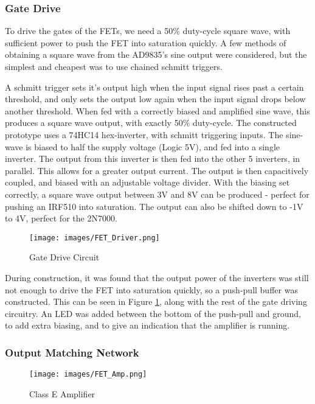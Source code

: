 \documentclass[a4paper,12pt]{article}
\begin{document}
\subsubsection{Gate Drive}
To drive the gates of the FETs, we need a 50\% duty-cycle square wave, with sufficient power to push the FET into saturation quickly. A few methods of obtaining a square wave from the AD9835's sine output were considered, but the simplest and cheapest was to use chained schmitt triggers.

A schmitt trigger sets it's output high when the input signal rises past a certain threshold, and only sets the output low again when the input signal drops below another threshold. When fed with a correctly biased and amplified sine wave, this produces a square wave output, with exactly 50\% duty-cycle. The constructed prototype uses a 74HC14 hex-inverter, with schmitt triggering inputs. The sine-wave is biased to half the supply voltage (Logic 5V), and fed into a single inverter. The output from this inverter is then fed into the other 5 inverters, in parallel. This allows for a greater output current. The output is then capacitively coupled, and biased with an adjustable voltage divider. With the biasing set correctly, a square wave output between 3V and 8V can be produced - perfect for pushing an IRF510 into saturation. The output can also be shifted down to -1V to 4V, perfect for the 2N7000.

\begin{figure}[h]
  \begin{center}
    \texttt{[image: images/FET\_Driver.png]}
  \end{center}
  \caption{Gate Drive Circuit}
  \label{fig:fet_drive}
\end{figure}

During construction, it was found that the output power of the inverters was still not enough to drive the FET into saturation quickly, so a push-pull buffer was constructed. This can be seen in Figure \ref{fig:fet_drive}, along with the rest of the gate driving circuitry. An LED was added between the bottom of the push-pull and ground, to add extra biasing, and to give an indication that the amplifier is running.

\subsubsection{Output Matching Network}

\begin{figure}[h]
  \begin{center}
    \texttt{[image: images/FET\_Amp.png]}
  \end{center}
  \caption{Class E Amplifier}
  \label{fig:fet_amp}
\end{figure}
\end{document}
